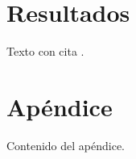 \documentclass[11pt,a4paper]{report}
\begin{document}
\chapter{Resultados}
Texto con cita \parencite{acemoglu2001}.

\printbibliography

\appendix
\chapter{Apéndice}
Contenido del apéndice.
\end{document}

